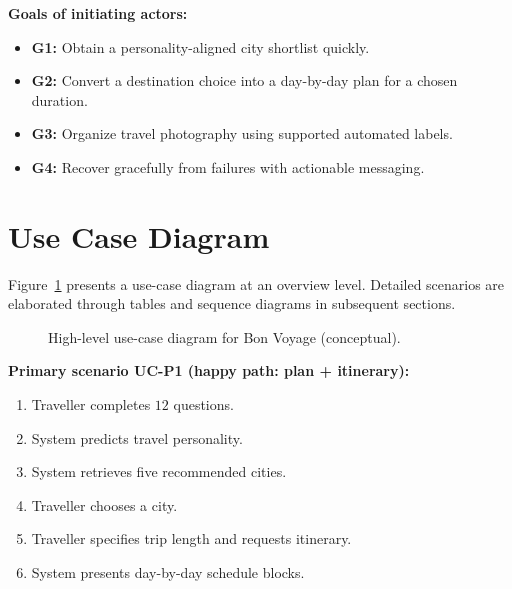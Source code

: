 \documentclass[12pt,oneside,openany]{report}
\begin{document}
\textbf{Goals of initiating actors:}
\begin{itemize}[nosep]
\item \textbf{G1:} Obtain a personality-aligned city shortlist quickly.
\item \textbf{G2:} Convert a destination choice into a day-by-day plan for a chosen duration.
\item \textbf{G3:} Organize travel photography using supported automated labels.
\item \textbf{G4:} Recover gracefully from failures with actionable messaging.
\end{itemize}

\section{Use Case Diagram}

Figure~\ref{fig:ucd} presents a use-case diagram at an overview level. Detailed scenarios are elaborated through tables and sequence diagrams in subsequent sections.

\begin{figure}[H]
\centering
{}
\caption{High-level use-case diagram for Bon Voyage (conceptual).}
\label{fig:ucd}
\end{figure}

\textbf{Primary scenario UC-P1 (happy path: plan + itinerary):}
\begin{enumerate}[nosep]
\item Traveller completes \(12\) questions.
\item System predicts travel personality.
\item System retrieves five recommended cities.
\item Traveller chooses a city.
\item Traveller specifies trip length and requests itinerary.
\item System presents day-by-day schedule blocks.
\end{enumerate}
\end{document}
